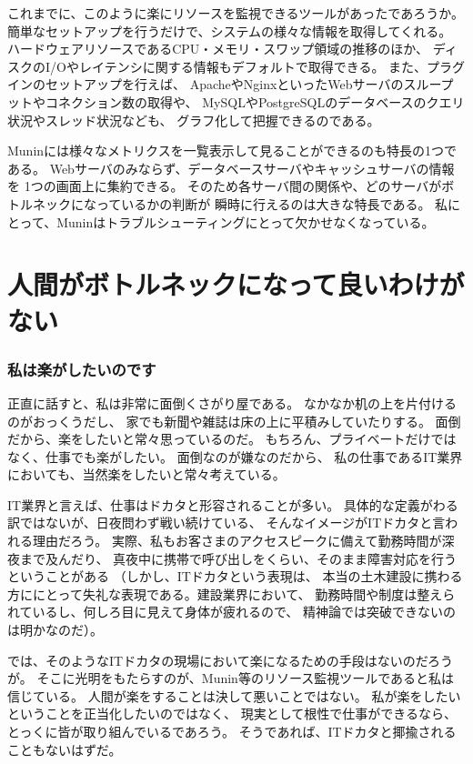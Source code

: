 これまでに、このように楽にリソースを監視できるツールがあったであろうか。
簡単なセットアップを行うだけで、システムの様々な情報を取得してくれる。
ハードウェアリソースであるCPU・メモリ・スワップ領域の推移のほか、
ディスクのI/Oやレイテンシに関する情報もデフォルトで取得できる。
また、プラグインのセットアップを行えば、
ApacheやNginxといったWebサーバのスループットやコネクション数の取得や、
MySQLやPostgreSQLのデータベースのクエリ状況やスレッド状況なども、
グラフ化して把握できるのである。

Muninには様々なメトリクスを一覧表示して見ることができるのも特長の1つである。
Webサーバのみならず、データベースサーバやキャッシュサーバの情報を
1つの画面上に集約できる。
そのため各サーバ間の関係や、どのサーバがボトルネックになっているかの判断が
瞬時に行えるのは大きな特長である。
私にとって、Muninはトラブルシューティングにとって欠かせなくなっている。

\section{人間がボトルネックになって良いわけがない}
\subsubsection{私は楽がしたいのです}
正直に話すと、私は非常に面倒くさがり屋である。
なかなか机の上を片付けるのがおっくうだし、
家でも新聞や雑誌は床の上に平積みしていたりする。
面倒だから、楽をしたいと常々思っているのだ。
もちろん、プライベートだけではなく、仕事でも楽がしたい。
面倒なのが嫌なのだから、
私の仕事であるIT業界においても、当然楽をしたいと常々考えている。

IT業界と言えば、仕事はドカタと形容されることが多い。
具体的な定義がわる訳ではないが、日夜問わず戦い続けている、
そんなイメージがITドカタと言われる理由だろう。
実際、私もお客さまのアクセスピークに備えて勤務時間が深夜まで及んだり、
真夜中に携帯で呼び出しをくらい、そのまま障害対応を行うということがある
（しかし、ITドカタという表現は、
本当の土木建設に携わる方ににとって失礼な表現である。建設業界において、
勤務時間や制度は整えられているし、何しろ目に見えて身体が疲れるので、
精神論では突破できないのは明かなのだ）。

では、そのようなITドカタの現場において楽になるための手段はないのだろうが。
そこに光明をもたらすのが、Munin等のリソース監視ツールであると私は信じている。
人間が楽をすることは決して悪いことではない。
私が楽をしたいということを正当化したいのではなく、
現実として根性で仕事ができるなら、とっくに皆が取り組んでいるであろう。
そうであれば、ITドカタと揶揄されることもないはずだ。

